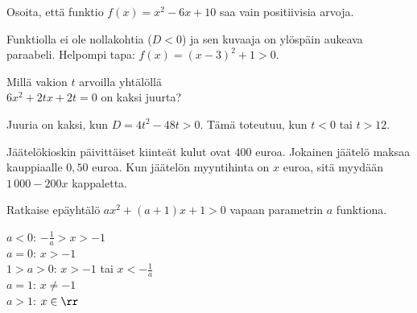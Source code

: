 \begin{tehtavasivu}
\begin{tehtava}
	Osoita, että funktio $f(x)=x^2-6x+10 $ saa vain positiivisia arvoja.
    \begin{vastaus}
	Funktiolla ei ole nollakohtia ($D<0$) ja sen kuvaaja on ylöspäin aukeava paraabeli.
    Helpompi tapa: $f(x)= (x-3)^2+1 >0.$
    \end{vastaus}
\end{tehtava}

\begin{tehtava}
	Millä vakion $t$ arvoilla yhtälöllä \\ $6x^2+2tx+2t=0$ on kaksi juurta?
	\begin{vastaus}
		Juuria on kaksi, kun $D=4t^2-48t>0$. Tämä toteutuu, kun $t < 0$ tai $t > 12$.
	\end{vastaus}
\end{tehtava}

\begin{tehtava}
Jäätelökioskin päivittäiset kiinteät kulut ovat $400$ euroa. Jokainen jäätelö maksaa kauppiaalle $0,50$ euroa. Kun jäätelön myyntihinta on $x$ euroa, sitä myydään $1\,000 - 200x$ kappaletta. 
\begin{alakohdat}
\end{alakohdat}
    \begin{vastaus}
		\begin{alakohdat}
		\end{alakohdat}
    \end{vastaus}
\end{tehtava}

\begin{tehtava}
    Ratkaise epäyhtälö $ax^2+(a+1)x+1 > 0$ vapaan parametrin $a$ funktiona.
    \begin{vastaus}
        $a < 0$: $-\frac{1}{a} > x > -1$ \\ $a = 0$: $x > -1$ \\ $1 > a > 0$: $x > -1$ tai $x < -\frac{1}{a}$ \\ $a = 1$: $x \neq -1$ \\ $a > 1$: $x \in \rr$
    \end{vastaus}
\end{tehtava}



\end{tehtavasivu}
